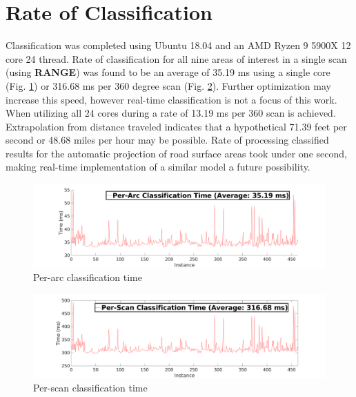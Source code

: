 \documentclass[numbered,pdftex]{ohio-etd}
\begin{document}
{{	}



	\section{Rate of Classification}{
		
		{Classification was completed using Ubuntu 18.04 and an AMD Ryzen 9 5900X 12 core 24 thread. Rate of classification for all nine areas of interest in a single scan (using \textbf{RANGE}) was found to be an average of 35.19 ms using a single core (Fig. \ref{fig:per_arc_classification_time}) or 316.68 ms per 360 degree scan (Fig. \ref{fig:per_scan_classification_rate}). Further optimization may increase this speed, however real-time classification is not a focus of this work. When utilizing all 24 cores during a rate of 13.19 ms per 360 scan is achieved. Extrapolation from distance traveled indicates that a hypothetical 71.39 feet per second or 48.68 miles per hour may be possible. Rate of processing classified results for the automatic projection of road surface areas took under one second, making real-time implementation of a similar model a future possibility.}
		
		\begin{figure}[H]
			\centering
			\includegraphics[width=0.9\linewidth]{Defense_Images/per_arc_classification_time}
			\caption[Per-Arc Time]{Per-arc classification time}
			\label{fig:per_arc_classification_time}
		\end{figure}
		
		\begin{figure}[H]
			\centering
			\includegraphics[width=0.9\linewidth]{Defense_Images/per_scan_classification_rate}
			\caption[Per-Scan Time]{Per-scan classification time}
			\label{fig:per_scan_classification_rate}
		\end{figure}
		
	}
		
} %
\end{document}
